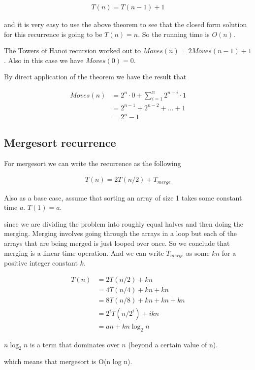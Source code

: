 \documentclass[12pt]{article}
\begin{document}
\begin{align*}
T(n) = T(n-1) + 1
\end{align*}

and it is very easy to use the above theorem to see that the closed form solution for this recurrence is going to be $T(n) = n$. So the running time is $O(n)$.

\medskip

The Towers of Hanoi recursion worked out to $Moves(n) = 2Moves(n-1) + 1$. Also in this case we have $Moves(0) = 0$.

By direct application of the theorem we have the result that

\begin{align*}
Moves(n) &= 2^n \cdot 0+ \sum_{i=1}^n 2^{n-i} \cdot 1 \\
&=  2^{n-1} + 2^{n-2} + \ldots + 1 \\
&= 2^{n} - 1
\end{align*}

\subsection*{Mergesort recurrence}

For mergesort we can write the recurrence as the following

\begin{align*}
T(n) = 2T(n/2) + T_{merge}
\end{align*}

Also as a base case, assume that sorting an array of size 1 takes some constant time $a$. $T(1) = a$.

since we are dividing the problem into roughly equal halves and then doing the merging. Merging involves going through the arrays in a loop but each of the arrays that are being merged is just looped over once. So we conclude that merging is a linear time operation. And we can write $T_{merge}$ as some $kn$ for a positive integer constant $k$.

\begin{align*}
T(n) &= 2T(n/2) + kn \\
&= 4T(n/4) + kn + kn \\
&= 8T(n/8) + kn + kn + kn \\
&= 2^i T(n/2^i) + ikn\\
&= an + kn \log_2 n 
\end{align*}

$n \log_2 n$ is a term that dominates over $n$ (beyond a certain value of n).

which means that mergesort is O(n log n).
\end{document}
